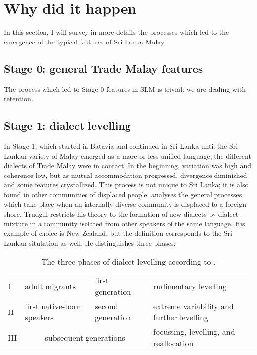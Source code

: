  



\section{Why did it happen}
In this section, I will survey in more details the processes which led to the emergence of the typical features of Sri Lanka Malay.
 

\subsection{Stage 0: general Trade Malay features}
The process  which led to Stage 0 features in SLM is trivial: we are dealing with retention.



\subsection{Stage 1: dialect levelling}
In Stage 1, which started in Batavia and continued in Sri Lanka until the Sri Lankan variety of Malay emerged as a more or less unified language, the different dialects of Trade Malay were in contact. In the beginning, variation was high and coherence low, but as mutual accommodation progressed, divergence diminished and some features crystallized. This process is not unique to Sri Lanka; it is also found in other communities of displaced people. \citet{Trudgill1986, Trudgill2004} analyses the general processes which take place when an internally diverse community is displaced to a foreign shore. Trudgill restricts his theory to the formation of new dialects by dialect mixture in a community isolated from other speakers of the same language. His example of choice is New Zealand, but the definition corresponds to the Sri Lankan situtation as well. He distinguishes three phases:

\begin{table}[h!]
\centering
\begin{tabular}{lllp{3.5cm}}
 I & adult migrants & first generation & rudimentary levelling\\
II & first native-born speakers & second generation & extreme variability and further levelling\\
III& \multicolumn{2}{c}{subsequent generations} & focussing, levelling, and reallocation %
\end{tabular}
\caption{The three phases of dialect levelling according to \citet{Trudgill1986}.}
\label{tab:dialectlevelling}
\end{table}

